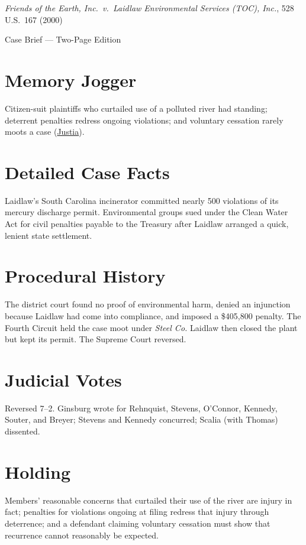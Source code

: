 \documentclass[12pt]{article}
\begin{document}
\begin{center}
{\LARGE \textit{Friends of the Earth, Inc.\ v.\ Laidlaw Environmental Services (TOC), Inc.}, 528 U.S.\ 167 (2000)\par}
\vspace{0.5em}
{\large Case Brief --- Two-Page Edition\par}
\end{center}

\section{Memory Jogger}
Citizen-suit plaintiffs who curtailed use of a polluted river had standing; deterrent penalties redress ongoing violations; and voluntary cessation rarely moots a case (\href{https://supreme.justia.com/cases/federal/us/528/167/}{Justia}).

\section{Detailed Case Facts}
Laidlaw's South Carolina incinerator committed nearly 500 violations of its mercury discharge permit. Environmental groups sued under the Clean Water Act for civil penalties payable to the Treasury after Laidlaw arranged a quick, lenient state settlement.

\section{Procedural History}
The district court found no proof of environmental harm, denied an injunction because Laidlaw had come into compliance, and imposed a \$405,800 penalty. The Fourth Circuit held the case moot under \textit{Steel Co.} Laidlaw then closed the plant but kept its permit. The Supreme Court reversed.

\section{Judicial Votes}
Reversed 7--2. Ginsburg wrote for Rehnquist, Stevens, O'Connor, Kennedy, Souter, and Breyer; Stevens and Kennedy concurred; Scalia (with Thomas) dissented.

\section{Holding}
Members' reasonable concerns that curtailed their use of the river are injury in fact; penalties for violations ongoing at filing redress that injury through deterrence; and a defendant claiming voluntary cessation must show that recurrence cannot reasonably be expected.
\end{document}
